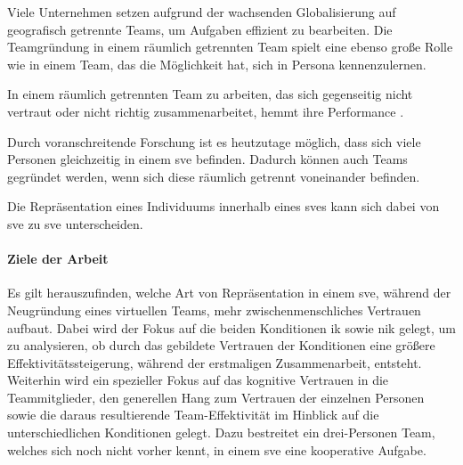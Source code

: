 \documentclass[a4paper,11pt]{article}%
\renewcommand{\\}{\vspace*{0.5\baselineskip} \newline}
\begin{document}
Viele Unternehmen setzen aufgrund der wachsenden Globalisierung auf geografisch getrennte Teams, um Aufgaben effizient zu bearbeiten. Die Teamgründung in einem räumlich getrennten Team spielt eine ebenso große Rolle wie in einem Team, das die Möglichkeit hat, sich in Persona kennenzulernen.
	
In einem räumlich getrennten Team zu arbeiten, das sich gegenseitig nicht vertraut oder nicht richtig zusammenarbeitet, hemmt ihre Performance \citep[S. 98-107]{huang1998supporting} \citep[S. 399-417]{turoff1993distributed}.
	
	
	Durch voranschreitende Forschung ist es heutzutage möglich, dass sich viele Personen gleichzeitig in einem \ac{sve} befinden. Dadurch können auch Teams gegründet werden, wenn sich diese räumlich getrennt voneinander befinden.
	
	Die Repräsentation eines Individuums innerhalb eines \ac{sve}s kann sich dabei von \ac{sve} zu \ac{sve} unterscheiden.
	
	\paragraph{Ziele der Arbeit}
%


Es gilt herauszufinden, welche Art von Repräsentation in einem \ac{sve}, während der Neugründung eines virtuellen Teams, mehr zwischenmenschliches Vertrauen aufbaut. Dabei wird der Fokus auf die beiden Konditionen \ac{ik} sowie \ac{nik} gelegt, um zu analysieren, ob durch das gebildete Vertrauen der Konditionen eine größere Effektivitätssteigerung, während der erstmaligen Zusammenarbeit, entsteht.
Weiterhin wird ein spezieller Fokus auf das kognitive Vertrauen in die Teammitglieder, den generellen Hang zum Vertrauen der einzelnen Personen sowie die daraus resultierende Team-Effektivität im Hinblick auf die unterschiedlichen Konditionen gelegt. Dazu bestreitet ein drei-Personen Team, welches sich noch nicht vorher kennt, in einem \ac{sve} eine kooperative Aufgabe.
\end{document}
